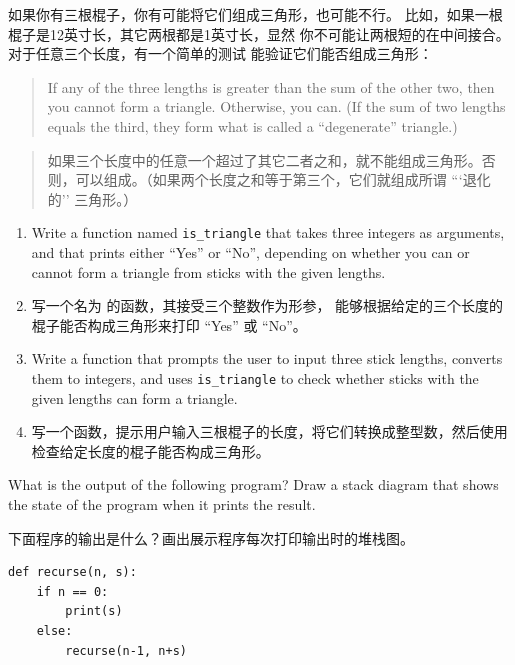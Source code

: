 {{{{\begin{exercise}
如果你有三根棍子，你有可能将它们组成三角形，也可能不行。
比如，如果一根棍子是12英寸长，其它两根都是1英寸长，显然
你不可能让两根短的在中间接合。对于任意三个长度，有一个简单的测试
能验证它们能否组成三角形：

\begin{quotation}
If any of the three lengths is greater than the sum of the other
  two, then you cannot form a triangle.  Otherwise, you
  can.  (If the sum of two lengths equals the third, they form
    what is called a ``degenerate'' triangle.)
\end{quotation}

\begin{quotation}
如果三个长度中的任意一个超过了其它二者之和，就不能组成三角形。否则，可以组成。（如果两个长度之和等于第三个，它们就组成所谓 ```退化的'' 三角形。）
\end{quotation}

\begin{enumerate}

\item Write a function named \verb"is_triangle" that takes three
  integers as arguments, and that prints either ``Yes'' or ``No'', depending
  on whether you can or cannot form a triangle from sticks with the
  given lengths.

\item 写一个名为  的函数，其接受三个整数作为形参，
   能够根据给定的三个长度的棍子能否构成三角形来打印 ``Yes'' 或 ``No''。

\item Write a function that prompts the user to input three stick
  lengths, converts them to integers, and uses \verb"is_triangle" to
  check whether sticks with the given lengths can form a triangle.

\item 写一个函数，提示用户输入三根棍子的长度，将它们转换成整型数，然后使用
    检查给定长度的棍子能否构成三角形。

\end{enumerate}

\end{exercise}

\begin{exercise}
What is the output of the following program?
Draw a stack diagram that shows the state of the program
when it prints the result.

下面程序的输出是什么？画出展示程序每次打印输出时的堆栈图。

\begin{lstlisting}
def recurse(n, s):
    if n == 0:
        print(s)
    else:
        recurse(n-1, n+s)


\end{lstlisting}
\end{exercise}}}}}
